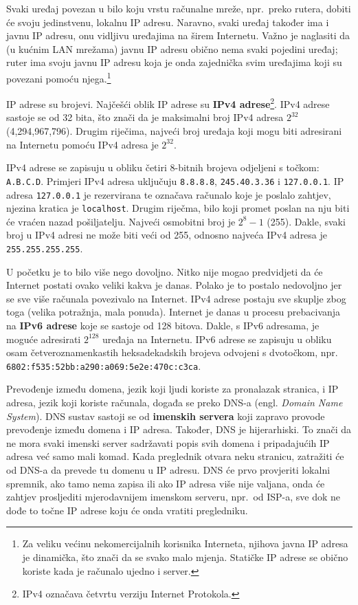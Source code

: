 Svaki uređaj povezan u bilo koju vrstu računalne mreže, npr.\ preko rutera, dobiti će svoju jedinstvenu, lokalnu IP adresu.
Naravno, svaki uređaj također ima i javnu IP adresu, onu vidljivu uređajima na širem Internetu.
Važno je naglasiti da (u kućnim LAN mrežama) javnu IP adresu obično nema svaki pojedini uređaj; ruter ima svoju javnu IP adresu koja je onda zajednička svim uređajima koji su povezani pomoću njega.\footnote{Za veliku većinu nekomercijalnih korisnika Interneta, njihova javna IP adresa je dinamička, što znači da se svako malo mjenja. Statičke IP adrese se obično koriste kada je računalo ujedno i server.}

IP adrese su brojevi.
Najčešći oblik IP adrese su \textbf{IPv4 adrese}\footnote{IPv4 označava četvrtu verziju Internet Protokola.}.
IPv4 adrese sastoje se od 32 bita, što znači da je maksimalni broj IPv4 adresa $ 2^{32} $ (4,294,967,796).
Drugim riječima, najveći broj uređaja koji mogu biti adresirani na Internetu pomoću IPv4 adresa je $ 2^{32} $.

IPv4 adrese se zapisuju u obliku četiri 8-bitnih brojeva odjeljeni s točkom: \verb|A.B.C.D|.
Primjeri IPv4 adresa uključuju \verb|8.8.8.8|, \verb|245.40.3.36| i \verb|127.0.0.1|.
IP adresa \verb|127.0.0.1| je rezervirana te označava računalo koje je poslalo zahtjev, njezina kratica je \verb|localhost|.
Drugim riječma, bilo koji promet poslan na nju biti će vraćen nazad pošiljatelju.
Najveći osmobitni broj je $ 2^8 - 1 $ (255).
Dakle, svaki broj u IPv4 adresi ne može biti veći od 255, odnosno najveća IPv4 adresa je \verb|255.255.255.255|.

U početku je to bilo više nego dovoljno.
Nitko nije mogao predvidjeti da će Internet postati ovako veliki kakva je danas.
Polako je to postalo nedovoljno jer se sve više računala povezivalo na Internet.
IPv4 adrese postaju sve skuplje zbog toga (velika potražnja, mala ponuda).
Internet je danas u procesu prebacivanja na \textbf{IPv6 adrese} koje se sastoje od 128 bitova.
Dakle, s IPv6 adresama, je moguće adresirati $ 2^{128} $ uređaja na Internetu.
IPv6 adrese se zapisuju u obliku osam četveroznamenkastih heksadekadskih brojeva odvojeni s dvotočkom, npr. \verb|6802:f535:52bb:a290:a069:5e2e:470c:c3ca|.

Prevođenje između domena, jezik koji ljudi koriste za pronalazak stranica, i IP adresa, jezik koji koriste računala, događa se preko DNS-a (engl. \textit{Domain Name System}).
DNS sustav sastoji se od \textbf{imenskih servera} koji zapravo provode prevođenje između domena i IP adresa.
Također, DNS je hijerarhiski.
To znači da ne mora svaki imenski server sadržavati popis svih domena i pripadajućih IP adresa već samo mali komad.
Kada preglednik otvara neku stranicu, zatražiti će od DNS-a da prevede tu domenu u IP adresu.
DNS će prvo provjeriti lokalni spremnik, ako tamo nema zapisa ili ako IP adresa više nije valjana, onda će zahtjev prosljediti mjerodavnijem imenskom serveru, npr.\ od ISP-a, sve dok ne dođe to točne IP adrese koju će onda vratiti pregledniku.

